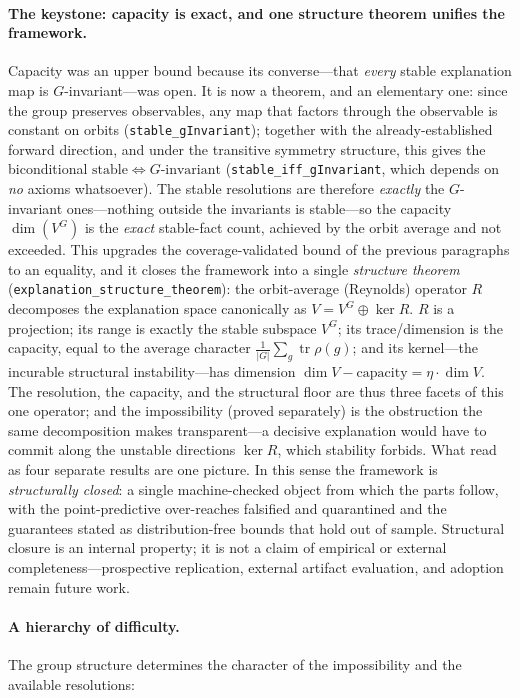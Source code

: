 \documentclass[11pt,a4paper]{article}
\begin{document}
\paragraph{The keystone: capacity is exact, and one structure theorem unifies the framework.}
Capacity was an upper bound because its converse---that \emph{every} stable explanation map
is $G$-invariant---was open. It is now a theorem, and an elementary one: since the group
preserves observables, any map that factors through the observable is constant on orbits
(\texttt{stable\_gInvariant}); together with the already-established forward direction, and under
the transitive symmetry structure, this gives the biconditional
$\text{stable} \Leftrightarrow G\text{-invariant}$ (\texttt{stable\_iff\_gInvariant}, which
depends on \emph{no} axioms whatsoever). The stable resolutions are therefore \emph{exactly}
the $G$-invariant ones---nothing outside the invariants is stable---so the capacity
$\dim(V^G)$ is the \emph{exact} stable-fact count, achieved by the orbit average and not
exceeded. This upgrades the coverage-validated bound of the previous paragraphs to an
equality, and it closes the framework into a single \emph{structure theorem}
(\texttt{explanation\_structure\_theorem}): the orbit-average (Reynolds) operator $R$
decomposes the explanation space canonically as $V = V^G \oplus \ker R$. $R$ is a projection; its
range is exactly the stable subspace $V^G$; its trace/dimension is the capacity, equal to the
average character $\tfrac{1}{|G|}\sum_g \operatorname{tr}\rho(g)$; and its kernel---the incurable
structural instability---has dimension $\dim V - \mathrm{capacity} = \eta\cdot\dim V$. The
resolution, the capacity, and the structural floor are thus three facets of this one operator; and
the impossibility (proved separately) is the obstruction the same decomposition makes
transparent---a decisive explanation would have to commit along the unstable directions $\ker R$,
which stability forbids. What read as four separate results are one picture. In this sense the framework is \emph{structurally closed}: a single
machine-checked object from which the parts follow, with the point-predictive over-reaches
falsified and quarantined and the guarantees stated as distribution-free bounds that hold out of
sample. Structural closure is an internal property; it is not a claim of empirical or external
completeness---prospective replication, external artifact evaluation, and adoption remain future
work.

\paragraph{A hierarchy of difficulty.}
The group structure determines the character of the impossibility and the
available resolutions:
\end{document}
